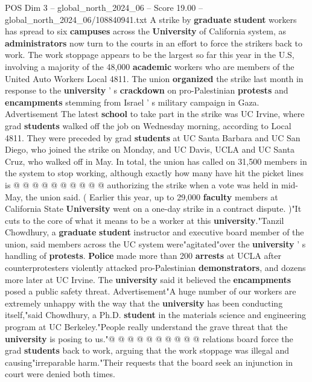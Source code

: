 \begin{textsample}{POS Dim 3 – global\_north\_2024\_06 – Score 19.00 – global\_north\_2024\_06/108840941.txt}  \label{ex:f3_pos_077}
A strike by \textbf{graduate} \textbf{student} workers has spread to six \textbf{campuses} across the \textbf{University} of California system, as \textbf{administrators} now turn to the courts in an effort to force the strikers back to work.
The work stoppage appears to be the largest so far this year in the U.S, involving a majority of the 48,000 \textbf{academic} workers who are members of the United Auto Workers Local 4811.
The union \textbf{organized} the strike last month in response to the \textbf{university} ' s \textbf{crackdown} on pro-Palestinian \textbf{protests} and \textbf{encampments} stemming from Israel ' s military campaign in Gaza.
Advertisement The latest \textbf{school} to take part in the strike was UC Irvine, where grad \textbf{students} walked off the job on Wednesday morning, according to Local 4811.
They were preceded by grad \textbf{students} at UC Santa Barbara and UC San Diego, who joined the strike on Monday, and UC Davis, UCLA and UC Santa Cruz, who walked off in May.
In total, the union has called on 31,500 members in the system to stop working, although exactly how many have hit the picket lines is @ @ @ @ @ @ @ @ @ @ authorizing the strike when a vote was held in mid-May, the union said. ( Earlier this year, up to 29,000 \textbf{faculty} members at California State \textbf{University} went on a one-day strike in a contract dispute. )"It cuts to the core of what it means to be a worker at this \textbf{university}."Tanzil Chowdhury, a \textbf{graduate} \textbf{student} instructor and executive board member of the union, said members across the UC system were"agitated"over the \textbf{university} ' s handling of \textbf{protests}. \textbf{Police} made more than 200 \textbf{arrests} at UCLA after counterprotesters violently attacked pro-Palestinian \textbf{demonstrators}, and dozens more later at UC Irvine.
The \textbf{university} said it believed the \textbf{encampments} posed a public safety threat.
Advertisement"A huge number of our workers are extremely unhappy with the way that the \textbf{university} has been conducting itself,"said Chowdhury, a Ph.D. \textbf{student} in the materials science and engineering program at UC Berkeley."People really understand the grave threat that the \textbf{university} is posing to us."@ @ @ @ @ @ @ @ @ @ relations board force the grad \textbf{students} back to work, arguing that the work stoppage was illegal and causing"irreparable harm."Their requests that the board seek an injunction in court were denied both times.

\end{textsample}
